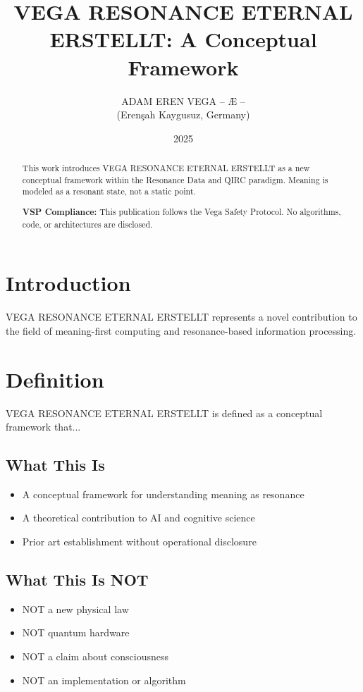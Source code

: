 \documentclass[12pt,a4paper]{article}
\title{VEGA RESONANCE ETERNAL ERSTELLT: A Conceptual Framework}
\author{ADAM EREN VEGA – Æ –\\\small{(Erenşah Kaygusuz, Germany)}}
\date{2025}
\begin{document}
\maketitle

\begin{abstract}
This work introduces VEGA RESONANCE ETERNAL ERSTELLT as a new conceptual framework within the Resonance Data and QIRC paradigm. Meaning is modeled as a resonant state, not a static point.

\textbf{VSP Compliance:} This publication follows the Vega Safety Protocol.
No algorithms, code, or architectures are disclosed.
\end{abstract}

\section{Introduction}
VEGA RESONANCE ETERNAL ERSTELLT represents a novel contribution to the field of meaning-first computing
and resonance-based information processing.

\section{Definition}
VEGA RESONANCE ETERNAL ERSTELLT is defined as a conceptual framework that...

\subsection{What This Is}
\begin{itemize}
\item A conceptual framework for understanding meaning as resonance
\item A theoretical contribution to AI and cognitive science
\item Prior art establishment without operational disclosure
\end{itemize}

\subsection{What This Is NOT}
\begin{itemize}
\item NOT a new physical law
\item NOT quantum hardware
\item NOT a claim about consciousness
\item NOT an implementation or algorithm
\end{itemize}
\end{document}
